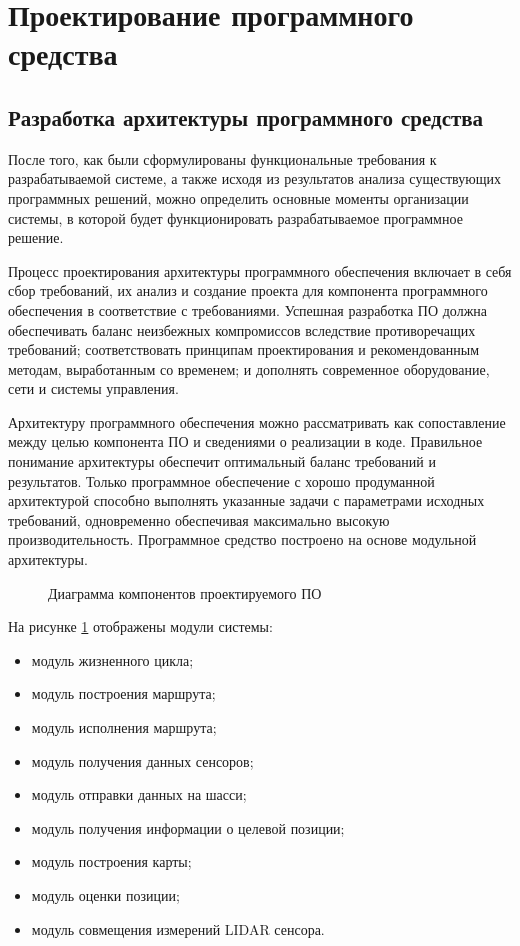 \section{Проектирование программного средства}

\subsection{Разработка архитектуры программного средства}

После того, как были сформулированы функциональные требования к разрабатываемой
системе,  а  также  исходя  из  результатов  анализа  существующих
программных решений, можно определить основные моменты организации системы,  в
которой  будет  функционировать  разрабатываемое  программное  решение.

Процесс проектирования архитектуры программного обеспечения включает в себя сбор
требований, их анализ и создание проекта для компонента программного
обеспечения в соответствие с требованиями. Успешная разработка ПО должна
обеспечивать баланс неизбежных компромиссов вследствие противоречащих
требований;  соответствовать  принципам  проектирования  и  рекомендованным
методам,  выработанным  со  временем;  и  дополнять  современное оборудование,
сети и системы управления. 

Архитектуру  программного  обеспечения  можно рассматривать  как  сопоставление
между целью компонента ПО и сведениями о реализации в коде. Правильное понимание
архитектуры  обеспечит  оптимальный баланс требований и результатов. Только
программное обеспечение с хорошо продуманной архитектурой способно выполнять
указанные задачи с параметрами исходных требований, одновременно обеспечивая
максимально высокую производительность. Программное средство построено на основе
модульной архитектуры. 

\FloatBarrier
\begin{figure}[H]
\centering
\caption{Диаграмма компонентов проектируемого ПО}
\label{fig:components}
\end{figure}

На рисунке \ref{fig:components} отображены модули системы:~
\begin{itemize}
	\item модуль жизненного цикла;
	\item модуль построения маршрута;
	\item модуль исполнения маршрута;
	\item модуль получения данных сенсоров;
	\item модуль отправки данных на шасси;
	\item модуль получения информации о целевой позиции;
	\item модуль построения карты;
	\item модуль оценки позиции;
	\item модуль совмещения измерений LIDAR сенсора.
\end{itemize}

